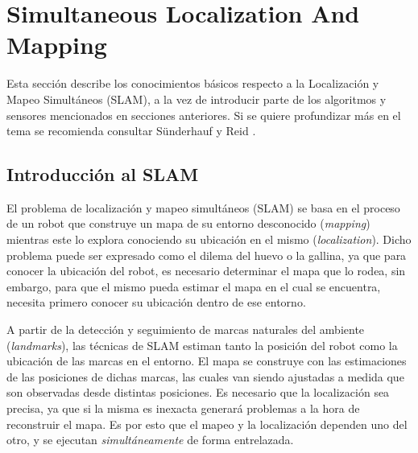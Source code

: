 \section{Simultaneous Localization And Mapping}
\label{sec:slam}
Esta sección describe los conocimientos básicos respecto a la Localización y Mapeo Simultáneos (SLAM), a la vez de introducir parte de los algoritmos y sensores mencionados en secciones anteriores. Si se quiere profundizar más en el tema se recomienda consultar Sünderhauf \cite{suenderhauf2012} y Reid \cite{reid2016}.

\subsection{Introducción al SLAM}
El problema de localización y mapeo simultáneos (SLAM) se basa en el proceso de un robot que construye un mapa de su entorno desconocido (\textit{mapping}) mientras este lo explora conociendo su ubicación en el mismo (\textit{localization}). Dicho problema puede ser expresado como el dilema del huevo o la gallina, ya que para conocer la ubicación del robot, es necesario determinar el mapa que lo rodea, sin embargo, para que el mismo pueda estimar el mapa en el cual se encuentra, necesita primero conocer su ubicación dentro de ese entorno. 

A partir de la detección y seguimiento de marcas naturales del ambiente (\textit{landmarks}), las técnicas de SLAM  estiman  tanto  la  posición  del  robot  como  la  ubicación  de las marcas en el entorno. El mapa se construye con las estimaciones de las posiciones  de  dichas  marcas,  las  cuales  van  siendo ajustadas  a  medida  que  son observadas desde distintas posiciones. Es necesario que la localización sea precisa, ya que si la misma es inexacta generará problemas a la hora de reconstruir el mapa. Es por esto que el mapeo y la localización dependen uno del otro, y se ejecutan \textit{simultáneamente} de forma entrelazada.

